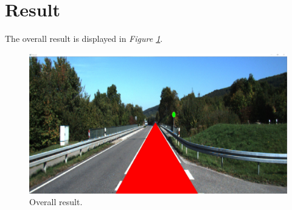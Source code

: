 \documentclass{article}
\begin{document}
\section{Result}
The overall result is displayed in \textit{Figure \ref{img_result}}.

\begin{figure}[h]
\begin{center}
\includegraphics[width=1\textwidth]{images/result}
\caption{\footnotesize{Overall result.}}
\label{img_result}
\end{center}
\end{figure}
\end{document}
